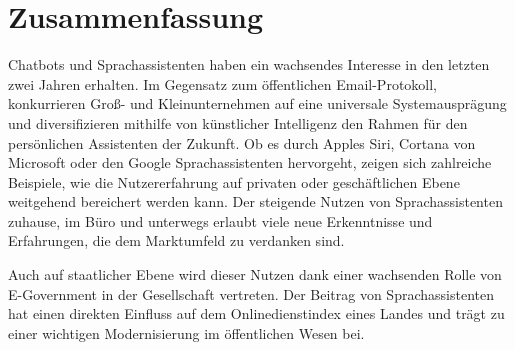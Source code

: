 


\newpage
\chapter*{Zusammenfassung}
Chatbots und Sprachassistenten haben ein wachsendes Interesse in den letzten zwei Jahren erhalten. %
Im Gegensatz zum öffentlichen Email-Protokoll, 
konkurrieren Groß- und Kleinunternehmen auf eine universale Systemausprägung und diversifizieren mithilfe von künstlicher Intelligenz den Rahmen für den persönlichen Assistenten der Zukunft.
Ob es durch Apples Siri, Cortana von Microsoft oder den Google Sprachassistenten hervorgeht, zeigen sich zahlreiche Beispiele, wie die Nutzererfahrung auf privaten oder geschäftlichen Ebene weitgehend bereichert werden kann.
Der steigende Nutzen von Sprachassistenten zuhause, im Büro und unterwegs erlaubt viele neue Erkenntnisse und Erfahrungen, die dem Marktumfeld zu verdanken sind. 


 
Auch auf staatlicher Ebene wird dieser Nutzen dank einer wachsenden Rolle von E-Government in der Gesellschaft vertreten. %
Der Beitrag von Sprachassistenten hat einen direkten Einfluss auf dem Onlinedienstindex eines Landes und trägt zu einer wichtigen Modernisierung im öffentlichen Wesen bei.

